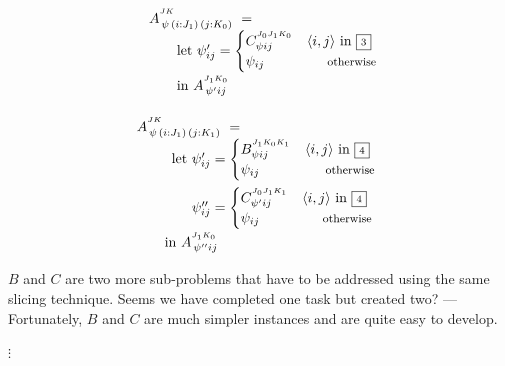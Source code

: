 \begin{equation}\LeftEqNo
\renewcommand\arraystretch{1.5}
\begin{array}{l@{}l}
	A^{^{JK}}_{\,\psi\,(i : J_1)\,(j : K_0)} ~=~ \\
	\qquad
	\textrm{let}~\psi'_{ij} = \begin{cases}
	  C^{^{J_0J_1K_0}}_{\psi ij} & \langle i,j\rangle\mbox{ in }\qbox3 \\
	  \psi_{ij} & \otherwise
	\end{cases} \\
	\qquad\textrm{in}~
	A^{^{J_1K_0}}_{\,\psi' ij}
\end{array}
\label{intro:let in A 2 using B}
\end{equation}

\begin{equation}\LeftEqNo
\renewcommand\arraystretch{1.5}
\begin{array}{l@{}l}
	\lspan2{A^{^{JK}}_{\,\psi\,(i : J_1)\,(j : K_1)} ~=~} \\
	\qquad
	\textrm{let}~ & \psi'_{ij} = \begin{cases}
	  B^{^{J_1K_0K_1}}_{\psi ij} & \langle i,j\rangle\mbox{ in }\qbox4 \\
	  \psi_{ij} & \otherwise
	\end{cases} \\[1.2em]
	& \psi''_{ij} = \begin{cases}
	  C^{^{J_0J_1K_1}}_{\psi' ij} & \langle i,j\rangle\mbox{ in }\qbox4 \\
	  \psi_{ij} & \otherwise
	\end{cases} \\
	\lspan2{
	\qquad\textrm{in}~A^{^{J_1K_0}}_{\,\psi'' ij}
	}
\end{array}
\label{intro:let in A 2 using B}
\end{equation}

$B$ and $C$ are two more sub-problems that have to be addressed using the same slicing technique.
Seems we have completed one task but created two? --- Fortunately, $B$ and $C$ are much simpler instances
and are quite easy to develop.


\begin{center}$\vdots$
\end{center}


